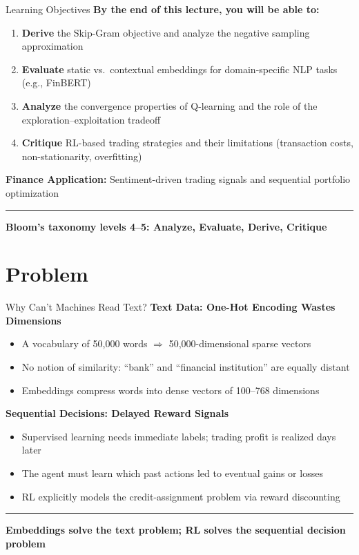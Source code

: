 \documentclass[8pt,aspectratio=169]{beamer}
\newcommand{\bottomnote}[1]{%
\vfill
\vspace{-2mm}
\textcolor{mllavender2}{\rule{\textwidth}{0.4pt}}
\vspace{1mm}
\footnotesize
\textbf{#1}
}
\begin{document}
\begin{frame}[t]{Learning Objectives}
\textbf{By the end of this lecture, you will be able to:}
\begin{enumerate}
\item \textbf{Derive} the Skip-Gram objective and analyze the negative sampling approximation
\item \textbf{Evaluate} static vs.\ contextual embeddings for domain-specific NLP tasks (e.g., FinBERT)
\item \textbf{Analyze} the convergence properties of Q-learning and the role of the exploration--exploitation tradeoff
\item \textbf{Critique} RL-based trading strategies and their limitations (transaction costs, non-stationarity, overfitting)
\end{enumerate}
\vspace{0.3em}
\textbf{Finance Application:} Sentiment-driven trading signals and sequential portfolio optimization
\bottomnote{Bloom's taxonomy levels 4--5: Analyze, Evaluate, Derive, Critique}
\end{frame}


\section{Problem}

\begin{frame}[t]{Why Can't Machines Read Text?}
\textbf{Text Data: One-Hot Encoding Wastes Dimensions}
\begin{itemize}
\item A vocabulary of 50,000 words $\Rightarrow$ 50,000-dimensional sparse vectors
\item No notion of similarity: ``bank'' and ``financial institution'' are equally distant
\item Embeddings compress words into dense vectors of 100--768 dimensions
\end{itemize}
\vspace{0.5em}
\textbf{Sequential Decisions: Delayed Reward Signals}
\begin{itemize}
\item Supervised learning needs immediate labels; trading profit is realized days later
\item The agent must learn which past actions led to eventual gains or losses
\item RL explicitly models the credit-assignment problem via reward discounting
\end{itemize}
\bottomnote{Embeddings solve the text problem; RL solves the sequential decision problem}
\end{frame}
\end{document}

